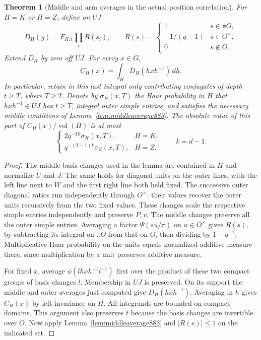 \documentclass[a4paper,11pt]{article}
\newtheorem{theorem}[proposition]{Theorem}
\theoremstyle{definition}
\theoremstyle{remark}
\numberwithin{equation}{section}
\begin{document}
\begin{theorem}[Middle and arm averages in the actual position correlation]
\leavevmode\label{thm:allpositions883}
For \(H=K\) or \(H=Z\), define on \(UJ\)
\[
 D_H(y)=F_{H,t}\prod_i R(s_i),\qquad
 R(s)=
 \begin{cases}
 1&s\in\pi O,\\
 -1/(q-1)&s\in O^\times,\\
 0&s\notin O .
 \end{cases}
\]
Extend \(D_H\) by zero off \(UJ\). For every \(x\in G\),
\begin{equation}
             C_H(x)=\int_H D_H(hxh^{-1})\,dh .
 \label{eq:allpositions883}
\end{equation}
In particular, retain in this last integral only contributing
conjugates of depth \(t\ge T\), where \(T\ge2\). Denote by
\(\sigma_H(x,T)\) the Haar probability in \(H\) that
\(hxh^{-1}\in UJ\) has \(t\ge T\), integral outer simple entries,
and satisfies the necessary middle conditions of
Lemma~\ref{lem:middleaverage883}. The absolute value of this part
of \(C_H(x)/\operatorname{vol}(H)\) is at most
\[
 \begin{cases}
      2q^{-Tk}\sigma_K(x,T),&H=K,\\
      q^{-(T-1)k}\sigma_Z(x,T),&H=Z,
 \end{cases}
 \qquad k=d-1 .
\]
\end{theorem}
\begin{proof}
The middle basis changes used in the lemma are contained in \(H\)
and normalize \(U\) and \(J\). The same holds for diagonal units
on the outer lines, with the left line next to \(W\) and the
first right line both held fixed. The successive outer diagonal
ratios run independently through \(O^\times\): their values
recover the outer units recursively from the two fixed values.
These changes scale the respective simple entries independently
and preserve \(P,v\). The middle changes preserve all the outer
simple entries. Averaging a factor \(\Psi(su/\pi)\) on
\(u\in O^\times\) gives \(R(s)\), by subtracting its integral
on \(\pi O\) from that on \(O\), then dividing by \(1-q^{-1}\).
Multiplicative Haar probability on the units equals normalized
additive measure there, since multiplication by a unit preserves
additive measure.

For fixed \(x\), average \(\phi(lhxh^{-1}l^{-1})\) first over
the product of these two compact groups of basis changes \(l\).
Membership in \(UJ\) is preserved. On its support the middle
and outer averages just computed give \(D_H(hxh^{-1})\).
Averaging in \(h\) gives \(C_H(x)\) by left invariance on \(H\).
All integrands are bounded on compact domains. This argument
also preserves \(t\) because the basis changes are invertible
over \(O\). Now apply Lemma~\ref{lem:middleaverage883} and
\(|R(s)|\le1\) on the indicated set.
\end{proof}
\end{document}
